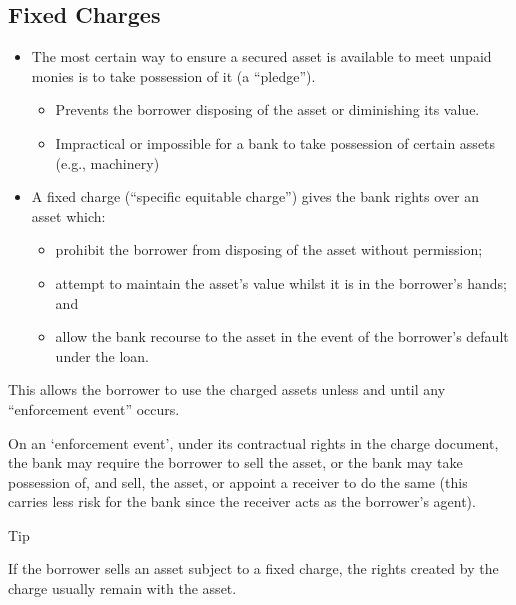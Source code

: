 \documentclass[
]{article}
\providecommand{\tightlist}{%
  \setlength{\itemsep}{0pt}\setlength{\parskip}{0pt}}
\newenvironment{env-0c49cb39-e036-4df4-8974-f6a48144dfd4}
{
    \savenotes\tcolorbox[blanker,breakable,left=5pt,borderline west={2pt}{-4pt}{cyan}]
}
{
    \endtcolorbox\spewnotes
}
\begin{document}
\hypertarget{fixed-charges}{%
\subsection{Fixed Charges}\label{fixed-charges}}

\begin{itemize}
\tightlist
\item
  The most certain way to ensure a secured asset is available to meet
  unpaid monies is to take possession of it (a ``pledge'').

  \begin{itemize}
  \tightlist
  \item
    Prevents the borrower disposing of the asset or diminishing its
    value.
  \item
    Impractical or impossible for a bank to take possession of certain
    assets (e.g., machinery)
  \end{itemize}
\item
  A fixed charge (``specific equitable charge'') gives the bank rights
  over an asset which:

  \begin{itemize}
  \tightlist
  \item
    prohibit the borrower from disposing of the asset without
    permission;
  \item
    attempt to maintain the asset's value whilst it is in the borrower's
    hands; and
  \item
    allow the bank recourse to the asset in the event of the borrower's
    default under the loan.
  \end{itemize}
\end{itemize}

This allows the borrower to use the charged assets unless and until any
``enforcement event'' occurs.

On an `enforcement event', under its contractual rights in the charge
document, the bank may require the borrower to sell the asset, or the
bank may take possession of, and sell, the asset, or appoint a receiver
to do the same (this carries less risk for the bank since the receiver
acts as the borrower's agent).

\begin{env-0c49cb39-e036-4df4-8974-f6a48144dfd4}

Tip

If the borrower sells an asset subject to a fixed charge, the rights
created by the charge usually remain with the asset.

\end{env-0c49cb39-e036-4df4-8974-f6a48144dfd4}
\end{document}
